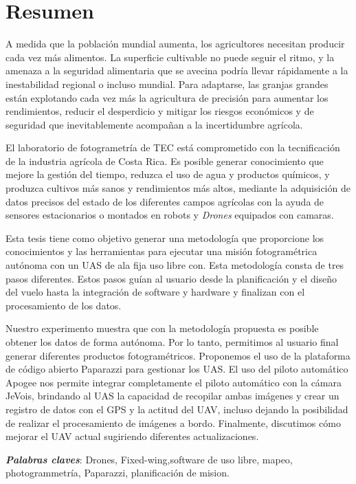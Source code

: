 \section*{Resumen}
A medida que la población mundial aumenta, los agricultores necesitan producir cada vez más alimentos. La superficie cultivable no puede seguir el ritmo, y la amenaza a la seguridad alimentaria que se avecina podría llevar rápidamente a la inestabilidad regional o incluso mundial. Para adaptarse, las granjas grandes están explotando cada vez más la agricultura de precisión para aumentar los rendimientos, reducir el desperdicio y mitigar los riesgos económicos y de seguridad que inevitablemente acompañan a la incertidumbre agrícola.

El laboratorio de fotogrametría de TEC está comprometido con la tecnificación de la industria agrícola de Costa Rica. Es posible generar conocimiento que mejore la gestión del tiempo, reduzca el uso de agua y productos químicos, y produzca cultivos más sanos y rendimientos más altos, mediante la adquisición de datos precisos del estado de los diferentes campos agrícolas con la ayuda de sensores estacionarios o montados en robots y \textit{Drones} equipados con camaras.

Esta tesis tiene como objetivo generar una metodología que proporcione los conocimientos y las herramientas para ejecutar una misión fotogramétrica autónoma con un UAS de ala fija uso libre con. Esta metodología consta de tres pasos diferentes. Estos pasos guían al usuario desde la planificación y el diseño del vuelo hasta la integración de software y hardware y finalizan con el procesamiento de los datos.

Nuestro experimento muestra que con la metodología propuesta es posible obtener los datos de forma autónoma. Por lo tanto, permitimos al usuario final generar diferentes productos fotogramétricos. Proponemos el uso de la plataforma de código abierto Paparazzi para gestionar los UAS. El uso del piloto automático Apogee nos permite integrar completamente el piloto automático con la cámara JeVois, brindando al UAS la capacidad de recopilar ambas imágenes y crear un registro de datos con el GPS y la actitud del UAV, incluso dejando la posibilidad de realizar el procesamiento de imágenes a bordo.
Finalmente, discutimos cómo mejorar el UAV actual sugiriendo diferentes actualizaciones.

\textbf{\textit{Palabras claves}}: Drones, Fixed-wing,software de uso libre, mapeo, photogrammetría, Paparazzi, planificación de mision.